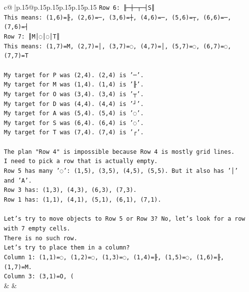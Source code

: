 \documentclass{article}
\begin{document}
{\begin{supertabular}{c@{$\;$}|p{.15\linewidth}@{}p{.15\linewidth}p{.15\linewidth}p{.15\linewidth}p{.15\linewidth}p{.15\linewidth}}
{{{\texttt{Row 6: ╟─┼─┬─┤S║} \\
\texttt{This means: (1,6)=╟, (2,6)=─, (3,6)=┼, (4,6)=─, (5,6)=┬, (6,6)=─, (7,6)=┤} \\
\texttt{Row 7: ║M│◌│◌│T║} \\
\texttt{This means: (1,7)=M, (2,7)=│, (3,7)=◌, (4,7)=│, (5,7)=◌, (6,7)=◌, (7,7)=T} \\
\\ 
\texttt{My target for P was (2,4). (2,4) is '─'.} \\
\texttt{My target for M was (1,4). (1,4) is '╟'.} \\
\texttt{My target for O was (3,4). (3,4) is '┬'.} \\
\texttt{My target for D was (4,4). (4,4) is '┘'.} \\
\texttt{My target for A was (5,4). (5,4) is '◌'.} \\
\texttt{My target for S was (6,4). (6,4) is '◌'.} \\
\texttt{My target for T was (7,4). (7,4) is '┌'.} \\
\\ 
\texttt{The plan "Row 4" is impossible because Row 4 is mostly grid lines.} \\
\texttt{I need to pick a row that is actually empty.} \\
\texttt{Row 5 has many '◌': (1,5), (3,5), (4,5), (5,5). But it also has '│' and 'A'.} \\
\texttt{Row 3 has: (1,3), (4,3), (6,3), (7,3).} \\
\texttt{Row 1 has: (1,1), (4,1), (5,1), (6,1), (7,1).} \\
\\ 
\texttt{Let's try to move objects to Row 5 or Row 3? No, let's look for a row with 7 empty cells.} \\
\texttt{There is no such row.} \\
\texttt{Let's try to place them in a column?} \\
\texttt{Column 1: (1,1)=◌, (1,2)=◌, (1,3)=◌, (1,4)=╟, (1,5)=◌, (1,6)=╟, (1,7)=M.} \\
\texttt{Column 3: (3,1)=O, (} \\
            }
        }
    }
    & & \\ \\


\end{supertabular}}
\end{document}
